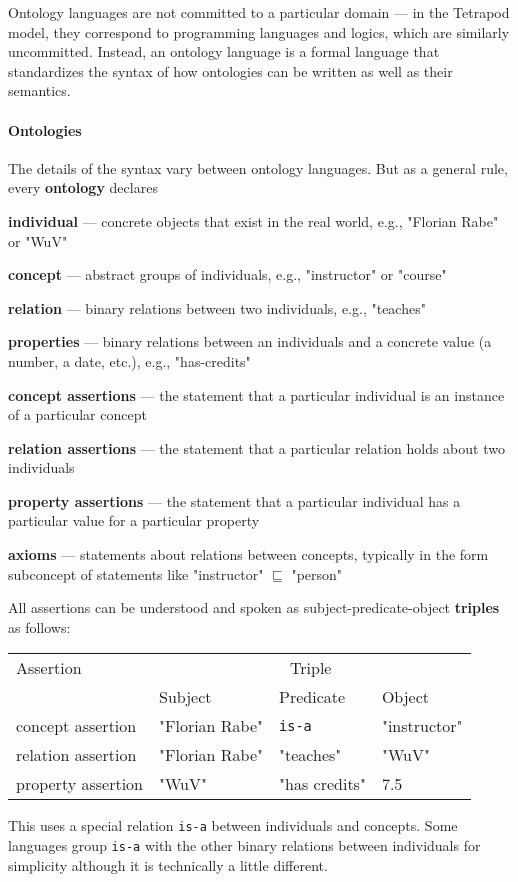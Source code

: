 Ontology languages are not committed to a particular domain --- in the Tetrapod model, they correspond to programming languages and logics, which are similarly uncommitted.
Instead, an ontology language is a formal language that standardizes the syntax of how ontologies can be written as well as their semantics.

\paragraph{Ontologies}
The details of the syntax vary between ontology languages.
But as a general rule, every \textbf{ontology} declares
\begin{compactitem}
 \item \textbf{individual} --- concrete objects that exist in the real world, e.g., "Florian Rabe" or "WuV"
 \item \textbf{concept} --- abstract groups of individuals, e.g., "instructor" or "course"
 \item \textbf{relation} --- binary relations between two individuals, e.g., "teaches"
 \item \textbf{properties} --- binary relations between an individuals and a concrete value (a number, a date, etc.), e.g., "has-credits"
 \item \textbf{concept assertions} --- the statement that a particular individual is an instance of a particular concept
 \item \textbf{relation assertions} --- the statement that a particular relation holds about two individuals
 \item \textbf{property assertions} --- the statement that a particular individual has a particular value for a particular property
 \item \textbf{axioms} --- statements about relations between concepts, typically in the form subconcept of statements like "instructor" $\sqsubseteq$ "person"
\end{compactitem}

All assertions can be understood and spoken as subject-predicate-object \textbf{triples} as follows:
\begin{center}
\begin{tabular}{l|lll}
Assertion & \multicolumn{3}{c}{Triple} \\
          & Subject & Predicate & Object \\
\hline
concept assertion  & "Florian Rabe" & \texttt{is-a} & "instructor" \\
relation assertion & "Florian Rabe" & "teaches" & "WuV" \\
property assertion & "WuV" & "has credits" & 7.5 \\
\end{tabular}
\end{center}
This uses a special relation \texttt{is-a} between individuals and concepts.
Some languages group \texttt{is-a} with the other binary relations between individuals for simplicity although it is technically a little different.

